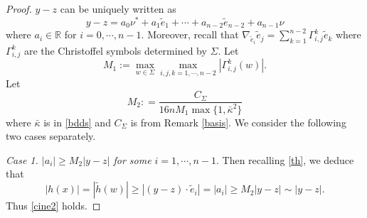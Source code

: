 \documentclass[10pt,a4paper]{amsart}
\newcommand{\R}{\mathbb{R}}
\begin{document}
\begin{proof}
$y-z$ can be uniquely written as
$$  y-z =  a_0 \nu^\ast + a_1 \tilde e_1 + \cdots + a_{n-2} \tilde e_{n-2} + a_{n-1} \nu
$$
where $a_i\in \R$ for $i=0, \cdots, n-1$.
Moreover, recall that $\nabla_{\tilde e_i}\tilde e_j= \sum_{k=1}^{n-2}\Gamma_{i,j}^k \tilde e_k$ where $\Gamma_{i,j}^k$ are the Christoffel symbols determined by $\Sigma$. Let
\begin{equation}\label{M1}
  M_1:= \max_{w \in \Sigma}\max_{i,j,k=1, \cdots, n-2} |\Gamma_{i,j}^k(w)|.
\end{equation}
Let
$$  M_2 : = \frac{C_\Sigma}{16n M_1 \max\{1,\bar\kappa^2\}}$$
where $\bar\kappa$ is in \eqref{bdds} and $C_\Sigma$ is from Remark \ref{basis}.
We consider the following two cases separately.

\medskip
\emph{Case 1. $|a_i| \ge M_2|y-z|$ for some $i=1,\cdots, n-1$}. Then recalling \eqref{th},
we deduce that
$$ |h(x)| = |\tilde h (w)|  \ge   |(y-z) \cdot \tilde e_i| = |a_i| \ge M_2|y-z|  \sim |y-z|.$$
Thus \eqref{cine2} holds.


\end{proof}
\end{document}

